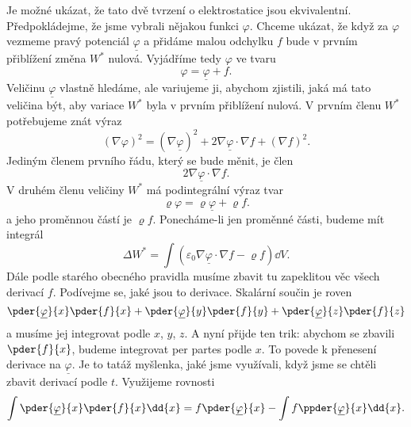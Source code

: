     Je možné ukázat, že tato dvě tvrzení o elektrostatice jsou ekvivalentní. Předpokládejme, že jsme
    vybrali nějakou funkci \(\varphi\). Chceme ukázat, že když za \(\varphi\) vezmeme pravý
    potenciál \(\underline{\varphi}\) a přidáme malou odchylku \(f\) bude v prvním přiblížení změna
    \(W^*\) nulová. Vyjádříme tedy \(\varphi\) ve tvaru
    \begin{equation*}
      \varphi = \underline{\varphi} + f.
    \end{equation*}
    Veličinu \(\underline{\varphi}\) vlastně hledáme, ale variujeme ji, abychom zjistili, jaká má
    tato veličina být, aby variace \(W^*\) byla v prvním přiblížení nulová. V prvním členu \(W^*\)
    potřebujeme znát výraz
    \begin{equation*}
      (\nabla\varphi)^2 = (\nabla\underline{\varphi})^2 + 2\nabla\underline{\varphi}\cdot\nabla f
                          + (\nabla f)^2.
    \end{equation*}
    Jediným členem prvního řádu, který se bude měnit, je člen
    \begin{equation*}
      2\nabla\underline{\varphi}\cdot\nabla f.
    \end{equation*}
    V druhém členu veličiny \(W^*\) má podintegrální výraz tvar
    \begin{equation*}
      \varrho\varphi = \varrho\underline{\varphi} + \varrho f.
    \end{equation*}
    a jeho proměnnou částí je \(\varrho f\). Ponecháme-li jen proměnné části, budeme mít integrál
    \begin{equation*}
      \Delta W^* = \int(\varepsilon_0\nabla\underline{\varphi}\cdot\nabla f - \varrho f)\dd{V}.
    \end{equation*}
    Dále podle starého obecného pravidla musíme zbavit tu zapeklitou věc všech derivací \(f\).
    Podívejme se, jaké jsou to derivace. Skalární součin je roven
    \begin{equation*}
      \pder{\underline{\varphi}}{x}\pder{f}{x} + \pder{\underline{\varphi}}{y}\pder{f}{y} + 
      \pder{\underline{\varphi}}{z}\pder{f}{z}
    \end{equation*}
    a musíme jej integrovat podle \(x\), \(y\), \(z\). A nyní přijde ten trik: abychom se zbavili
    \(\pder{f}{x}\), budeme integrovat per partes podle \(x\). To povede k přenesení derivace na
    \(\underline\varphi\). Je to tatáž myšlenka, jaké jsme využívali, když jsme se chtěli zbavit
    derivací podle \(t\). Využijeme rovnosti
    \begin{equation*}
      \int\pder{\underline{\varphi}}{x}\pder{f}{x}\dd{x} = f\pder{\underline{\varphi}}{x} -
      \int f\ppder{\underline{\varphi}}{x}\dd{x}.
    \end{equation*}
